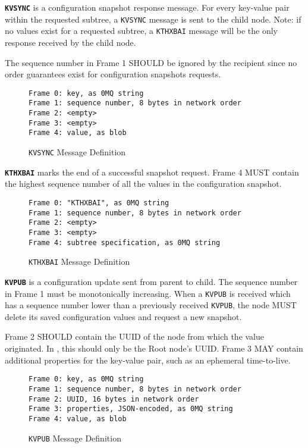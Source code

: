 \textbf{\texttt{KVSYNC}} is a configuration snapshot response message. For every key-value pair within the requested
subtree, a \texttt{KVSYNC} message is sent to the child node. Note: if no values exist for a requested subtree, a
\texttt{KTHXBAI} message will be the only response received by the child node.

The sequence number in Frame 1 SHOULD be ignored by the recipient since no order guarantees exist for configuration
snapshots requests.

\begin{figure}[H]
\vspace{+10pt}
\begin{verbatim}
Frame 0: key, as 0MQ string
Frame 1: sequence number, 8 bytes in network order
Frame 2: <empty>
Frame 3: <empty>
Frame 4: value, as blob
\end{verbatim}
\vspace{-20pt}
\caption{\texttt{KVSYNC} Message Definition}
\label{fig:message_kvsync}
\end{figure}

\textbf{\texttt{KTHXBAI}} marks the end of a successful snapshot request. Frame 4 MUST contain the highest sequence
number of all the values in the configuration snapshot.

\begin{figure}[H]
\vspace{+10pt}
\begin{verbatim}
Frame 0: "KTHXBAI", as 0MQ string
Frame 1: sequence number, 8 bytes in network order
Frame 2: <empty>
Frame 3: <empty>
Frame 4: subtree specification, as 0MQ string
\end{verbatim}
\vspace{-20pt}
\caption{\texttt{KTHXBAI} Message Definition}
\label{fig:message_kthxbai}
\end{figure}

\textbf{\texttt{KVPUB}} is a configuration update sent from parent to child. The sequence number in Frame 1 must be
monotonically increasing. When a \texttt{KVPUB} is received which has a sequence number lower than a previously received
\texttt{KVPUB}, the node MUST delete its saved configuration values and request a new snapshot.

Frame 2 SHOULD contain the UUID of the node from which the value originated. In \dcamp, this should only be the Root
node's UUID. Frame 3 MAY contain additional properties for the key-value pair, such as an ephemeral time-to-live.

\begin{figure}[H]
\vspace{+10pt}
\begin{verbatim}
Frame 0: key, as 0MQ string
Frame 1: sequence number, 8 bytes in network order
Frame 2: UUID, 16 bytes in network order
Frame 3: properties, JSON-encoded, as 0MQ string
Frame 4: value, as blob
\end{verbatim}
\vspace{-20pt}
\caption{\texttt{KVPUB} Message Definition}
\label{fig:message_kvpub}
\end{figure}


